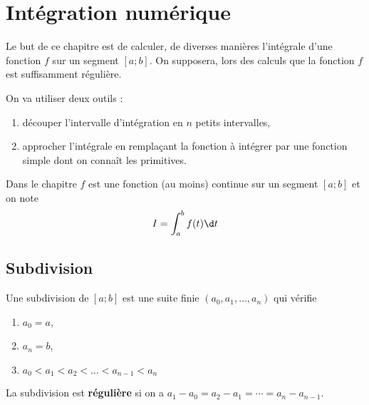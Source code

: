 \chapter{Intégration numérique}
\thispagestyle{empty}
{\sf Le but de ce chapitre est de calculer, de diverses manières l'intégrale d'une fonction $f$ sur un segment $[a;b]$. On supposera, lors des calculs que la fonction $f$ est suffisamment régulière.

On va utiliser deux outils :
\begin{enumerate}
    \item découper l'intervalle d'intégration en $n$ petits intervalles,
    \item approcher l'intégrale en remplaçant la fonction à intégrer par une fonction simple dont on connaît les primitives.
\end{enumerate}
Dans le chapitre $f$ est une fonction (au moins) continue sur un segment $[a;b]$ et on note
\[I = \int_a^b f(t) \d t\]
}
\section{Subdivision}
Une subdivision de $[a;b]$ est une suite finie $(a_0, a_1, \ldots, a_n)$ qui vérifie 
\begin{enumerate}
    \item $a_0=a$,
    \item $a_n=b$,
    \item $a_0 < a_1 < a_2 < \ldots < a_{n-1} < a_n$
\end{enumerate}
La subdivision est {\bf régulière} si on a $a_1-a_0=a_2-a_1=\cdots=a_n - a_{n-1}$.


